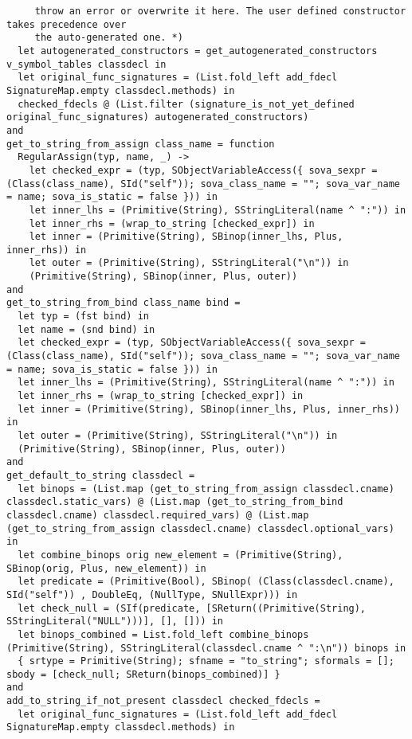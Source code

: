 \documentclass{article}
\begin{document}
\begin{verbatim}
     throw an error or overwrite it here. The user defined constructor takes precedence over
     the auto-generated one. *)
  let autogenerated_constructors = get_autogenerated_constructors v_symbol_tables classdecl in
  let original_func_signatures = (List.fold_left add_fdecl SignatureMap.empty classdecl.methods) in
  checked_fdecls @ (List.filter (signature_is_not_yet_defined original_func_signatures) autogenerated_constructors)
and
get_to_string_from_assign class_name = function
  RegularAssign(typ, name, _) ->
    let checked_expr = (typ, SObjectVariableAccess({ sova_sexpr = (Class(class_name), SId("self")); sova_class_name = ""; sova_var_name = name; sova_is_static = false })) in
    let inner_lhs = (Primitive(String), SStringLiteral(name ^ ":")) in
    let inner_rhs = (wrap_to_string [checked_expr]) in
    let inner = (Primitive(String), SBinop(inner_lhs, Plus, inner_rhs)) in
    let outer = (Primitive(String), SStringLiteral("\n")) in
    (Primitive(String), SBinop(inner, Plus, outer))
and
get_to_string_from_bind class_name bind =
  let typ = (fst bind) in
  let name = (snd bind) in
  let checked_expr = (typ, SObjectVariableAccess({ sova_sexpr = (Class(class_name), SId("self")); sova_class_name = ""; sova_var_name = name; sova_is_static = false })) in
  let inner_lhs = (Primitive(String), SStringLiteral(name ^ ":")) in
  let inner_rhs = (wrap_to_string [checked_expr]) in
  let inner = (Primitive(String), SBinop(inner_lhs, Plus, inner_rhs)) in
  let outer = (Primitive(String), SStringLiteral("\n")) in
  (Primitive(String), SBinop(inner, Plus, outer))
and
get_default_to_string classdecl =
  let binops = (List.map (get_to_string_from_assign classdecl.cname) classdecl.static_vars) @ (List.map (get_to_string_from_bind classdecl.cname) classdecl.required_vars) @ (List.map (get_to_string_from_assign classdecl.cname) classdecl.optional_vars) in
  let combine_binops orig new_element = (Primitive(String), SBinop(orig, Plus, new_element)) in
  let predicate = (Primitive(Bool), SBinop( (Class(classdecl.cname), SId("self")) , DoubleEq, (NullType, SNullExpr))) in
  let check_null = (SIf(predicate, [SReturn((Primitive(String), SStringLiteral("NULL")))], [], [])) in
  let binops_combined = List.fold_left combine_binops (Primitive(String), SStringLiteral(classdecl.cname ^ ":\n")) binops in
  { srtype = Primitive(String); sfname = "to_string"; sformals = []; sbody = [check_null; SReturn(binops_combined)] }
and
add_to_string_if_not_present classdecl checked_fdecls =
  let original_func_signatures = (List.fold_left add_fdecl SignatureMap.empty classdecl.methods) in

\end{verbatim}
\end{document}
